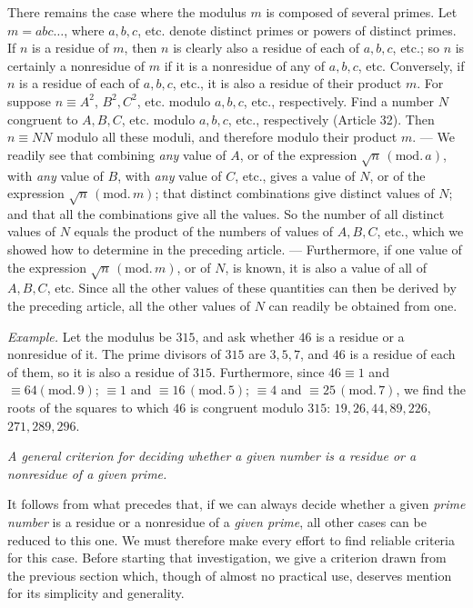 There remains the case where the modulus $m$ is composed of several primes. Let $m=abc\ldots$, where $a,b,c$, etc. denote distinct primes or powers of distinct primes. If $n$ is a residue of $m$, then $n$ is clearly also a residue of each of $a,b,c$, etc.; so $n$ is certainly a nonresidue of $m$ if it is a nonresidue of any of $a,b,c$, etc. Conversely, if $n$ is a residue of each of $a,b,c$, etc., it is also a residue of their product $m$. For suppose $n\equiv A^2$, $B^2,C^2$, etc. modulo $a,b,c$, etc., respectively. Find a number $N$ congruent to $A,B,C$, etc. modulo $a,b,c$, etc., respectively (Article 32). Then $n\equiv NN$ modulo all these moduli, and therefore modulo their product $m$. --- We readily see that combining \emph{any} value of $A$, or of the expression $\surd n\,(\mathrm{mod.}\,a)$, with \emph{any} value of $B$, with \emph{any} value of $C$, etc., gives a value of $N$, or of the expression $\surd n\,(\mathrm{mod.}\,m)$; that distinct combinations give distinct values of $N$; and that all the combinations give all the values. So the number of all distinct values of $N$ equals the product of the numbers of values of $A,B,C$, etc., which we showed how to determine in the preceding article. --- Furthermore, if one value of the expression $\surd n\,(\mathrm{mod.}\,m)$, or of $N$, is known, it is also a value of all of $A,B,C$, etc. Since all the other values of these quantities can then be derived by the preceding article, all the other values of $N$ can readily be obtained from one.

\emph{Example.} Let the modulus be $315$, and ask whether $46$ is a residue or a nonresidue of it. The prime divisors of $315$ are $3,5,7$, and $46$ is a residue of each of them, so it is also a residue of $315$. Furthermore, since $46\equiv1$ and $\equiv64 (\mathrm{mod.}\,9)$; $\equiv1$ and $\equiv16\,(\mathrm{mod.}\,5)$; $\equiv4$ and $\equiv25\,(\mathrm{mod.}\,7)$, we find the roots of the squares to which $46$ is congruent modulo $315$: $19,26,44,89,226$, $271,289,296$.

\begin{center}
\small\itshape
A general criterion for deciding whether a given number is a residue or a nonresidue of a given prime.
\end{center}

It follows from what precedes that, if we can always decide whether a given \emph{prime number} is a residue or a nonresidue of a \emph{given prime}, all other cases can be reduced to this one. We must therefore make every effort to find reliable criteria for this case. Before starting that investigation, we give a criterion drawn from the previous section which, though of almost no practical use, deserves mention for its simplicity and generality.

